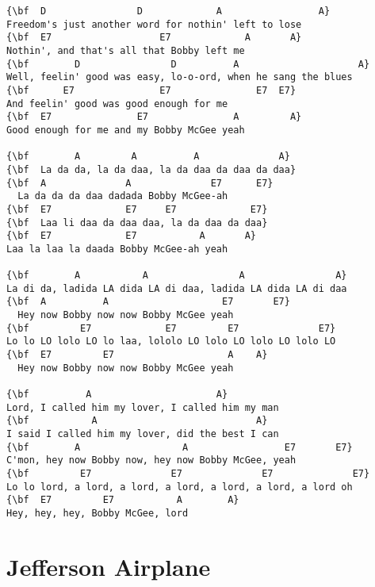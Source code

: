 \documentclass[a4paper]{article}
\begin{document}
\begin{Verbatim}[commandchars=\\\{\}]
{\bf  D                D             A                 A}
Freedom's just another word for nothin' left to lose
{\bf  E7                   E7             A       A}
Nothin', and that's all that Bobby left me
{\bf        D                D          A                     A}
Well, feelin' good was easy, lo-o-ord, when he sang the blues
{\bf      E7               E7               E7  E7}
And feelin' good was good enough for me
{\bf  E7               E7               A         A}
Good enough for me and my Bobby McGee yeah

{\bf        A         A          A              A}
{\bf  La da da, la da daa, la da daa da daa da daa}
{\bf  A              A              E7      E7}
  La da da da daa dadada Bobby McGee-ah
{\bf  E7             E7     E7             E7}
{\bf  Laa li daa da daa daa, la da daa da daa}
{\bf  E7             E7           A       A}
Laa la laa la daada Bobby McGee-ah yeah

{\bf        A           A                A                A}
La di da, ladida LA dida LA di daa, ladida LA dida LA di daa
{\bf  A          A                    E7       E7}
  Hey now Bobby now now Bobby McGee yeah
{\bf         E7             E7         E7              E7}
Lo lo LO lolo LO lo laa, lololo LO lolo LO lolo LO lolo LO 
{\bf  E7         E7                    A    A}
  Hey now Bobby now now Bobby McGee yeah

{\bf          A                      A}
Lord, I called him my lover, I called him my man
{\bf           A                            A}
I said I called him my lover, did the best I can
{\bf        A                  A                 E7       E7}
C'mon, hey now Bobby now, hey now Bobby McGee, yeah
{\bf         E7              E7              E7              E7}
Lo lo lord, a lord, a lord, a lord, a lord, a lord, a lord oh
{\bf  E7         E7           A        A}
Hey, hey, hey, Bobby McGee, lord

\end{Verbatim}
\newpage
\section{Jefferson Airplane}
\end{document}

